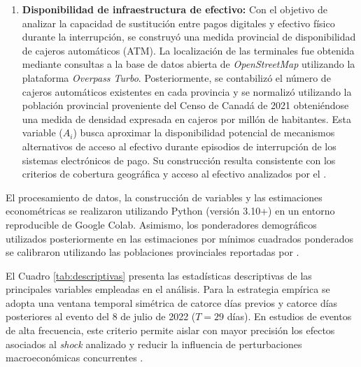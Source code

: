 \begin{enumerate}
    \item \textbf{Disponibilidad de infraestructura de efectivo:} Con el objetivo de analizar la capacidad de sustituci\'on entre pagos digitales 
y efectivo f\'isico durante la interrupci\'on, se construy\'o una medida 
provincial de disponibilidad de cajeros autom\'aticos (ATM).
La localizaci\'on de las terminales fue obtenida mediante consultas a la base 
de datos abierta de \textit{OpenStreetMap} utilizando la plataforma 
\textit{Overpass Turbo}. Posteriormente, se contabiliz\'o el n\'umero de cajeros 
autom\'aticos existentes en cada provincia y se normaliz\'o utilizando la 
poblaci\'on provincial proveniente del Censo de Canad\'a de 2021 
\citep{statscan2021pop} obteni\'endose una medida de densidad expresada en cajeros 
por mill\'on de habitantes.
Esta variable ($A_i$) busca aproximar la disponibilidad potencial de mecanismos 
alternativos de acceso al efectivo durante episodios de interrupci\'on de los 
sistemas electr\'onicos de pago. Su construcci\'on resulta consistente con los 
criterios de cobertura geogr\'afica y acceso al efectivo analizados por el  \cite{bankofcanada2023cash}.
\end{enumerate}

El procesamiento de datos, la construcci\'on de variables y las estimaciones 
econom\'etricas se realizaron utilizando Python (versi\'on 3.10+) en un entorno 
reproducible de Google Colab. Asimismo, los ponderadores demogr\'aficos 
utilizados posteriormente en las estimaciones por m\'inimos cuadrados ponderados 
se calibraron utilizando las poblaciones provinciales reportadas por 
\cite{statscan2021pop}.

El Cuadro \ref{tab:descriptivas} presenta las estad\'isticas descriptivas de las principales variables empleadas en el an\'alisis. Para la estrategia emp\'irica se adopta 
una ventana temporal sim\'etrica de catorce d\'ias previos y catorce d\'ias 
posteriores al evento del 8 de julio de 2022 ($T=29$ d\'ias). En estudios de 
eventos de alta frecuencia, este criterio permite aislar con mayor precisi\'on 
los efectos asociados al \textit{shock} analizado y reducir la influencia de 
perturbaciones macroecon\'omicas concurrentes \citep{schmidheiny2019event, 
cunningham2021causal}.


